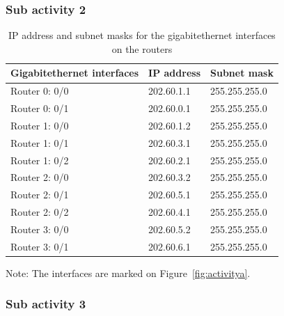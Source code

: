 \documentclass{lab_sheet}
\newcommand{\setting}[2]{
    \begin{tabular}{C{3cm}C{5cm}C{5cm}}
        \toprule
          #1 & IP address & Subnet mask\\
          \midrule
          #2
          \bottomrule
       \end{tabular}
}
\begin{document}
\subsubsection*{Sub activity 2}
\begin{table}[H]
	\centering
	\begin{threeparttable}
		\setting{Gigabitethernet interfaces}{
			Router 0: 0/0 & 202.60.1.1  & 255.255.255.0 \\
			Router 0: 0/1 & 202.60.0.1  & 255.255.255.0 \\
			Router 1: 0/0 & 202.60.1.2  & 255.255.255.0 \\
			Router 1: 0/1 & 202.60.3.1  & 255.255.255.0 \\
			Router 1: 0/2 & 202.60.2.1  & 255.255.255.0 \\
			Router 2: 0/0 & 202.60.3.2  & 255.255.255.0 \\
			Router 2: 0/1 & 202.60.5.1  & 255.255.255.0 \\
			Router 2: 0/2 & 202.60.4.1  & 255.255.255.0 \\
			Router 3: 0/0 & 202.60.5.2  & 255.255.255.0 \\
			Router 3: 0/1 & 202.60.6.1  & 255.255.255.0 \\
		}
		\begin{tablenotes}
			\small
			\item Note: The interfaces are marked on Figure~\ref{fig:activitya}.
		\end{tablenotes}
		\caption{IP address and subnet masks for the gigabitethernet interfaces on the routers}
		\label{tbl:gigasettingb}
	\end{threeparttable}
\end{table}

\subsubsection*{Sub activity 3}
\end{document}

